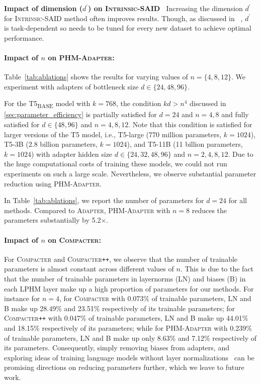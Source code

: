 \documentclass{article}
\newcommand{\basebase}{T5\textsubscript{\tiny BASE}\xspace}
\newcommand{\adapter}{\textsc{Adapter}\xspace}
\newcommand{\compacter}{\textsc{Compacter}\xspace}
\newcommand{\compacteronlyff}{\textsc{Compacter}\texttt{++}\xspace} %
\newcommand{\phmadapter}{\textsc{PHM-Adapter}\xspace}
\newcommand{\intrinsic}{\textsc{Intrinsic-SAID}\xspace}
\begin{document}
\textbf{Impact of dimension ($d^{\prime}$) on \intrinsic} $\:$ Increasing the dimension $d^{\prime}$ for \intrinsic method often improves results. Though, as discussed in ~\citep{aghajanyan2020intrinsic}, $d^{\prime}$ is task-dependent so needs to be tuned for every new dataset to achieve optimal performance.

\paragraph{Impact of $n$ on \phmadapter:}  Table~\ref{tab:ablations} shows the results for varying values of $n=\{4, 8, 12\}$. We experiment with adapters of bottleneck size $d \in \{24, 48, 96\}$.

For the \basebase model with $k=768$, the condition $kd>n^4$ discussed in \textsection\ref{sec:parameter_efficiency} is partially satisfied for $d=24$ and $n=4,8$ and fully satisfied for $d\in\{48, 96\}$ and $n=4,8,12$. Note that this condition is satisfied for larger versions of the T5 model, i.e., T5-large (770 million parameters, $k=1024$), T5-3B (2.8 billion parameters, $k=1024$), and T5-11B (11 billion parameters, $k=1024$) with adapter hidden size $d\in\{24, 32, 48, 96\}$ and $n = 2,4,8,12$. Due to the huge computational costs of training these models, we could not run experiments on such a large scale. Nevertheless, we observe substantial parameter reduction using \phmadapter. 

In Table~\ref{tab:ablations}, we report the number of parameters for $d=24$ for all methods. Compared to \adapter, \phmadapter with $n=8$ reduces the parameters substantially by 5.2$\times$.


\paragraph{Impact of $n$ on \compacter:} For \compacter and \compacteronlyff, we observe that the number of trainable parameters is almost constant across different values of $n$.  This is due to the fact that the number of trainable parameters in layernorms (LN) and biases (B) in each LPHM layer make up a high proportion of parameters for our methods. For instance for $n=4$, for \compacter with 0.073\% of trainable parameters, LN and B make up 28.49\% and 23.51\% respectively of its trainable parameters; for \compacteronlyff with 0.047\% of trainable parameters, LN and B make up 44.01\% and 18.15\% respectively of its parameters; while for \phmadapter with 0.239\% of trainable parameters, LN and B make up only 8.63\% and 7.12\% respectively of its parameters. Consequently, simply removing biases from adapters, and exploring ideas of training language models without layer normalizations~\citep{brock2021high} can be promising directions on reducing parameters further, which we leave to future work.
\end{document}
